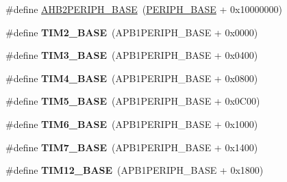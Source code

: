 \begin{DoxyCompactItemize}
\item 
\#define \hyperlink{group___peripheral__memory__map_gaeedaa71d22a1948492365e2cd26cfd46}{A\-H\-B2\-P\-E\-R\-I\-P\-H\-\_\-\-B\-A\-S\-E}~(\hyperlink{group___peripheral__memory__map_ga9171f49478fa86d932f89e78e73b88b0}{P\-E\-R\-I\-P\-H\-\_\-\-B\-A\-S\-E} + 0x10000000)
\item 
\hypertarget{group___peripheral__memory__map_ga00d0fe6ad532ab32f0f81cafca8d3aa5}{\#define {\bfseries T\-I\-M2\-\_\-\-B\-A\-S\-E}~(A\-P\-B1\-P\-E\-R\-I\-P\-H\-\_\-\-B\-A\-S\-E + 0x0000)}\label{group___peripheral__memory__map_ga00d0fe6ad532ab32f0f81cafca8d3aa5}

\item 
\hypertarget{group___peripheral__memory__map_gaf0c34a518f87e1e505cd2332e989564a}{\#define {\bfseries T\-I\-M3\-\_\-\-B\-A\-S\-E}~(A\-P\-B1\-P\-E\-R\-I\-P\-H\-\_\-\-B\-A\-S\-E + 0x0400)}\label{group___peripheral__memory__map_gaf0c34a518f87e1e505cd2332e989564a}

\item 
\hypertarget{group___peripheral__memory__map_ga56e2d44b0002f316527b8913866a370d}{\#define {\bfseries T\-I\-M4\-\_\-\-B\-A\-S\-E}~(A\-P\-B1\-P\-E\-R\-I\-P\-H\-\_\-\-B\-A\-S\-E + 0x0800)}\label{group___peripheral__memory__map_ga56e2d44b0002f316527b8913866a370d}

\item 
\hypertarget{group___peripheral__memory__map_ga3e1671477190d065ba7c944558336d7e}{\#define {\bfseries T\-I\-M5\-\_\-\-B\-A\-S\-E}~(A\-P\-B1\-P\-E\-R\-I\-P\-H\-\_\-\-B\-A\-S\-E + 0x0\-C00)}\label{group___peripheral__memory__map_ga3e1671477190d065ba7c944558336d7e}

\item 
\hypertarget{group___peripheral__memory__map_ga8268ec947929f192559f28c6bf7d1eac}{\#define {\bfseries T\-I\-M6\-\_\-\-B\-A\-S\-E}~(A\-P\-B1\-P\-E\-R\-I\-P\-H\-\_\-\-B\-A\-S\-E + 0x1000)}\label{group___peripheral__memory__map_ga8268ec947929f192559f28c6bf7d1eac}

\item 
\hypertarget{group___peripheral__memory__map_ga0ebf54364c6a2be6eb19ded6b18b6387}{\#define {\bfseries T\-I\-M7\-\_\-\-B\-A\-S\-E}~(A\-P\-B1\-P\-E\-R\-I\-P\-H\-\_\-\-B\-A\-S\-E + 0x1400)}\label{group___peripheral__memory__map_ga0ebf54364c6a2be6eb19ded6b18b6387}

\item 
\hypertarget{group___peripheral__memory__map_ga33dea32fadbaecea161c2ef7927992fd}{\#define {\bfseries T\-I\-M12\-\_\-\-B\-A\-S\-E}~(A\-P\-B1\-P\-E\-R\-I\-P\-H\-\_\-\-B\-A\-S\-E + 0x1800)}\label{group___peripheral__memory__map_ga33dea32fadbaecea161c2ef7927992fd}


\end{DoxyCompactItemize}

